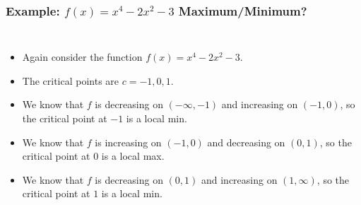 \documentclass[serif,ignorenonframetext]{beamer}
\begin{document}
\begin{frame}
  \frametitle{Example: $f(x)=x^4-2x^2-3$ Maximum/Minimum?}
  \begin{columns}
  \begin{itemize}[<+->]
  \item Again consider the function $f(x)=x^4-2x^2-3$.
  \item The critical points are $c=-1,0,1$.
  \item We know that $f$ is decreasing on $(-\infty,-1)$
    and increasing on $(-1,0)$, so the critical point
    at $-1$ is a local min.
  \item We know that $f$ is increasing on $(-1,0)$ and
    decreasing on $(0,1)$, so the critical point at
    $0$ is a local max.
  \item We know that $f$ is decreasing on $(0,1)$ and
    increasing on $(1,\infty)$, so the critical point
    at $1$ is a local min.
  \end{itemize}

\end{columns}
\end{frame}
\end{document}
